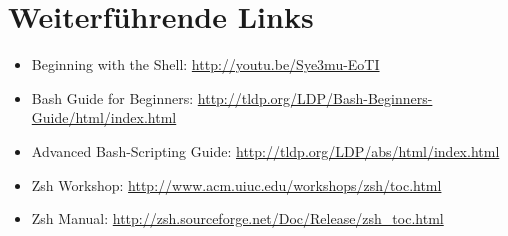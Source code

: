 \section{Weiterführende Links}
\begin{itemize}
  \item Beginning with the Shell: \url{http://youtu.be/Sye3mu-EoTI}
  \item Bash Guide for Beginners: \url{http://tldp.org/LDP/Bash-Beginners-Guide/html/index.html}
  \item Advanced Bash-Scripting Guide: \url{http://tldp.org/LDP/abs/html/index.html}
  \item Zsh Workshop: \url{http://www.acm.uiuc.edu/workshops/zsh/toc.html}
  \item Zsh Manual: \url{http://zsh.sourceforge.net/Doc/Release/zsh\_toc.html}
\end{itemize}
